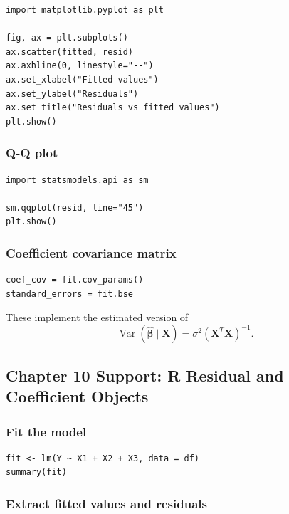 \begin{verbatim}
import matplotlib.pyplot as plt

fig, ax = plt.subplots()
ax.scatter(fitted, resid)
ax.axhline(0, linestyle="--")
ax.set_xlabel("Fitted values")
ax.set_ylabel("Residuals")
ax.set_title("Residuals vs fitted values")
plt.show()
\end{verbatim}

\subsubsection*{Q-Q plot}

\begin{verbatim}
import statsmodels.api as sm

sm.qqplot(resid, line="45")
plt.show()
\end{verbatim}

\subsubsection*{Coefficient covariance matrix}

\begin{verbatim}
coef_cov = fit.cov_params()
standard_errors = fit.bse
\end{verbatim}

These implement the estimated version of
\begin{equation}
  \operatorname{Var}(\widehat{\boldsymbol{\beta}}\mid\mathbf{X})
  =\sigma^2(\mathbf{X}^T\mathbf{X})^{-1}.
\end{equation}

\subsection{Chapter 10 Support: R Residual and Coefficient Objects}
\label{app:ch10-r-software-cookbook}

\subsubsection*{Fit the model}

\begin{verbatim}
fit <- lm(Y ~ X1 + X2 + X3, data = df)
summary(fit)
\end{verbatim}

\subsubsection*{Extract fitted values and residuals}

